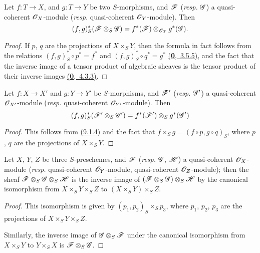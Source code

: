 \begin{prop}[9.1.4]
\label{prop-1.9.1.4}
Let $f:T\to X$, and $g:T\to Y$ be
two $S$-morphisms, and $\mathscr{F}$ ({\em resp.} $\mathscr{G}$) a quasi-coherent
$\mathscr{O}_X$-module ({\em resp.} quasi-coherent $\mathscr{O}_Y$-module). Then
\[
  (f,g)^*_S(\mathscr{F}\otimes_S\mathscr{G})=f^*(\mathscr{F})\otimes_{\mathscr{O}_T}g^*(\mathscr{G}).
\]
\end{prop}

\begin{proof}
\label{proof-prop-1.9.14}
If $p$, $q$ are the projections of $X\times_S Y$, then the formula in fact follows
from the relations $(f,g)^*_S\circ p^*=f^*$ and
$(f,g)^*_S\circ q^*=g^*$ \hyperref[env-0.3.5.5]{(\textbf{0},~3.5.5)}, and the fact that the inverse
image of a tensor product of algebraic sheaves is the tensor product of their inverse
images \hyperref[env-0.4.3.3]{(\textbf{0},~4.3.3)}.
\end{proof}

\begin{cor}[9.1.5]
\label{cor-1.9.1.5}
Let $f:X\to X'$ and $g:Y\to Y'$ be
$S$-morphisms, and $\mathscr{F}'$ ({\em resp.} $\mathscr{G}'$) a quasi-coherent
$\mathscr{O}_{X'}$-module ({\em resp.} quasi-coherent $\mathscr{O}_{Y'}$-module). Then
\[
  (f,g)^*_S(\mathscr{F}'\otimes_S\mathscr{G}')=f^*(\mathscr{F}')\otimes_S g^*(\mathscr{G}')
\]
\end{cor}

\begin{proof}
\label{proof-cor-1.9.1.5}
This follows from \hyperref[prop-1.9.1.4]{(9.1.4)} and the fact that $f\times_S g=(f\circ p, g\circ q)_S$,
where $p$, $q$ are the projections of $X\times_S Y$.
\end{proof}

\begin{cor}[9.1.6]
\label{cor-1.9.1.6}
Let $X$, $Y$, $Z$ be three $S$-preschemes, and $\mathscr{F}$ ({\em resp.} $\mathscr{G}$, $\mathscr{H}$) a
quasi-coherent $\mathscr{O}_X$-module ({\em resp.} quasi-coherent $\mathscr{O}_Y$-module, quasi-coherent
$\mathscr{O}_Z$-module); then the sheaf $\mathscr{F}\otimes_S\mathscr{G}\otimes_S\mathscr{H}$ is the inverse image
of $(\mathscr{F}\otimes_S\mathscr{G})\otimes_S\mathscr{H}$ by the canonical isomorphism from
$X\times_S Y\times_S Z$ to $(X\times_S Y)\times_S Z$.
\end{cor}

\begin{proof}
\label{proof-cor-1.9.16}
This isomorphism is given by $(p_1,p_2)_S\times_S p_3$, where $p_1$, $p_2$, $p_3$
are the projections of $X\times_S Y\times_S Z$.

Similarly, the inverse image of $\mathscr{G}\otimes_S\mathscr{F}$ under the canonical isomorphism from
$X\times_S Y$ to $Y\times_S X$ is $\mathscr{F}\otimes_S\mathscr{G}$.
\end{proof}

